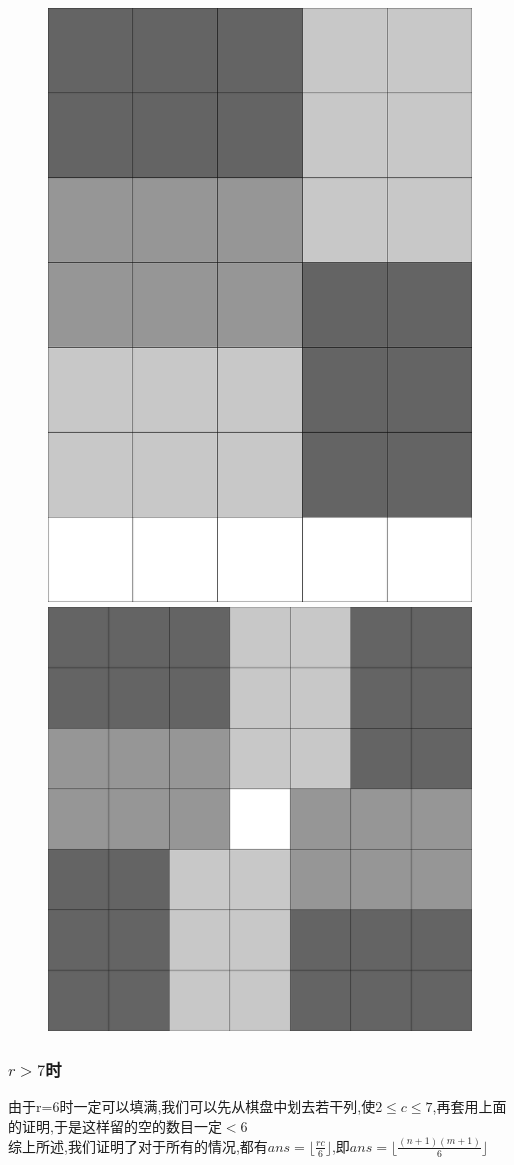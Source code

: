 \documentclass{beamer}
\begin{document}
\begin{frame}
\begin{figure}[htbp]
\begin{minipage}[t]{0.32\textwidth}
					\end{minipage}
				\end{figure}
				\begin{figure}[htbp]
					\centering
					\begin{minipage}[t]{0.48\textwidth}
						\centering
						\includegraphics[height=0.68\textwidth]{pictures/5-4.png}
					\end{minipage}
					\begin{minipage}[t]{0.48\textwidth}
						\centering
						\includegraphics[height=0.68\textwidth]{pictures/5-5.png}
					\end{minipage}
				\end{figure}

			\end{frame}
			\begin{frame}\frametitle{$r>7$时}
				由于r=6时一定可以填满,我们可以先从棋盘中划去若干列,使$2\le c\le7$,再套用上面的证明,于是这样留的空的数目一定$<6$\\
				综上所述,我们证明了对于所有的情况,都有$ans=\lfloor\frac{rc}{6}\rfloor$,即$ans=\lfloor\frac{(n+1)(m+1)}6\rfloor$
			\end{frame}
\end{document}
